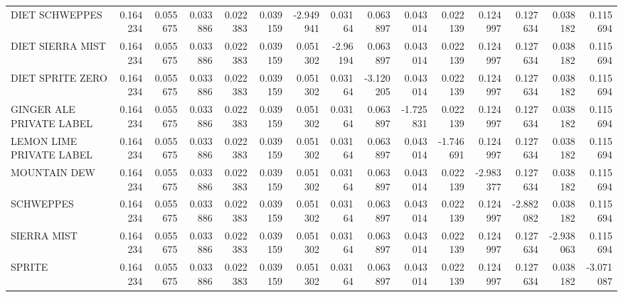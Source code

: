 \begin{tabular}{lrrrrrrrrrrrrrr}
DIET SCHWEPPES                &    0.164234 &         0.055675 &                       0.033886 &                       0.022383 &           0.039159 &       -2.949941 &           0.03164 &          0.063897 &                  0.043014 &                  0.022139 &      0.124997 &   0.127634 &     0.038182 &  0.115694 \\
DIET SIERRA MIST              &    0.164234 &         0.055675 &                       0.033886 &                       0.022383 &           0.039159 &        0.051302 &          -2.96194 &          0.063897 &                  0.043014 &                  0.022139 &      0.124997 &   0.127634 &     0.038182 &  0.115694 \\
DIET SPRITE ZERO              &    0.164234 &         0.055675 &                       0.033886 &                       0.022383 &           0.039159 &        0.051302 &           0.03164 &         -3.120205 &                  0.043014 &                  0.022139 &      0.124997 &   0.127634 &     0.038182 &  0.115694 \\
GINGER ALE PRIVATE LABEL      &    0.164234 &         0.055675 &                       0.033886 &                       0.022383 &           0.039159 &        0.051302 &           0.03164 &          0.063897 &                 -1.725831 &                  0.022139 &      0.124997 &   0.127634 &     0.038182 &  0.115694 \\
LEMON LIME PRIVATE LABEL      &    0.164234 &         0.055675 &                       0.033886 &                       0.022383 &           0.039159 &        0.051302 &           0.03164 &          0.063897 &                  0.043014 &                 -1.746691 &      0.124997 &   0.127634 &     0.038182 &  0.115694 \\
MOUNTAIN DEW                  &    0.164234 &         0.055675 &                       0.033886 &                       0.022383 &           0.039159 &        0.051302 &           0.03164 &          0.063897 &                  0.043014 &                  0.022139 &     -2.983377 &   0.127634 &     0.038182 &  0.115694 \\
SCHWEPPES                     &    0.164234 &         0.055675 &                       0.033886 &                       0.022383 &           0.039159 &        0.051302 &           0.03164 &          0.063897 &                  0.043014 &                  0.022139 &      0.124997 &  -2.882082 &     0.038182 &  0.115694 \\
SIERRA MIST                   &    0.164234 &         0.055675 &                       0.033886 &                       0.022383 &           0.039159 &        0.051302 &           0.03164 &          0.063897 &                  0.043014 &                  0.022139 &      0.124997 &   0.127634 &    -2.938063 &  0.115694 \\
SPRITE                        &    0.164234 &         0.055675 &                       0.033886 &                       0.022383 &           0.039159 &        0.051302 &           0.03164 &          0.063897 &                  0.043014 &                  0.022139 &      0.124997 &   0.127634 &     0.038182 & -3.071087 \\
\bottomrule
\end{tabular}
